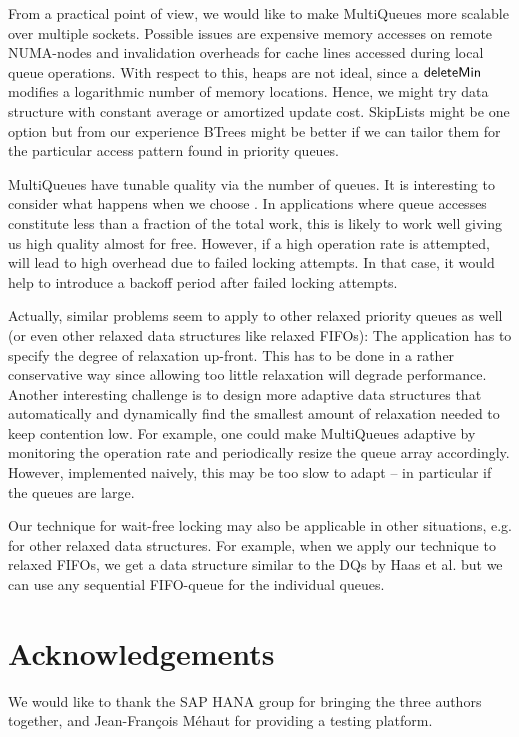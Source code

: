 \documentclass[a4paper,12pt]{article}
\newcommand{\Id}[1]{\ensuremath{\text{{\sf #1}}}}
\begin{document}
From a practical point of view, we would like to make MultiQueues more scalable over multiple sockets. Possible issues are expensive memory accesses on remote NUMA-nodes and invalidation overheads for cache lines accessed during local queue operations. With respect to this, heaps are not ideal, since a \Id{deleteMin} modifies a logarithmic number of memory locations. Hence, we might try data structure with constant average or amortized update cost. SkipLists might be one option but from our experience \cite{DKMS04} BTrees might be better if we can tailor them for the particular access pattern found in priority queues.





MultiQueues have tunable quality via the number  of queues. 
It is interesting to consider what happens when we choose .
In applications where queue accesses constitute less than a fraction  of the total work, this is likely to work well giving us high quality almost for free. However, if a high operation rate is attempted,  will lead to high overhead due to failed locking attempts.  In that case, it would help to introduce a backoff period after failed locking attempts.

Actually, similar problems seem to apply to other relaxed priority queues as well (or even other relaxed data structures like relaxed FIFOs): The application has to specify the degree of relaxation up-front. This has to be done in a rather conservative way since allowing too little relaxation will degrade performance. Another interesting challenge is to design more adaptive data structures that automatically 
and dynamically find the smallest amount of relaxation needed to keep contention low. For example, one could make MultiQueues adaptive by monitoring the operation rate and periodically resize the queue array  accordingly. 
However, implemented naively, this may be too slow to adapt -- in particular if the queues are large. 

Our technique for wait-free locking may also be applicable in other situations, e.g. for other relaxed data structures. For example, when we apply our technique to relaxed FIFOs, we get a data structure similar to the DQs by Haas et al. \cite{HLHPSKS13} but we can use any sequential FIFO-queue for the individual queues.

\section*{Acknowledgements}
We would like to thank the SAP HANA group for bringing the three authors together,
and Jean-Fran\c{c}ois M\'ehaut for providing a testing platform.
\end{document}
